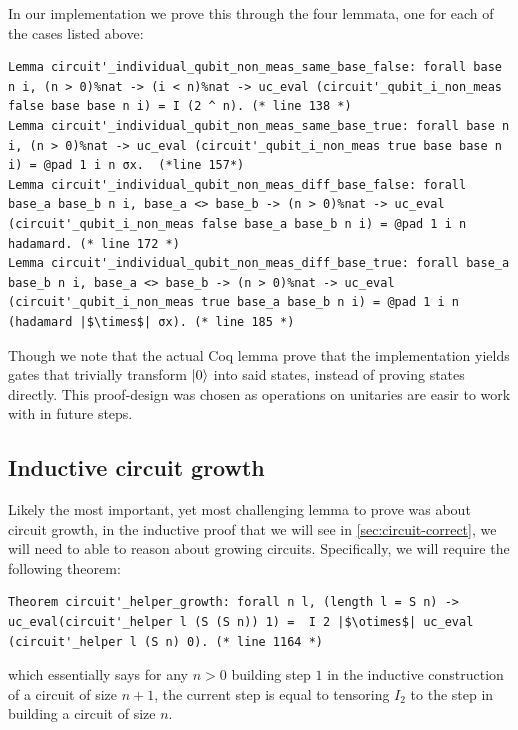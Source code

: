 \documentclass{article}
\begin{document}
In our implementation we prove this through the four lemmata, one for each of the cases listed above:
\begin{verbatim}
Lemma circuit'_individual_qubit_non_meas_same_base_false: forall base n i, (n > 0)%nat -> (i < n)%nat -> uc_eval (circuit'_qubit_i_non_meas false base base n i) = I (2 ^ n). (* line 138 *)
Lemma circuit'_individual_qubit_non_meas_same_base_true: forall base n i, (n > 0)%nat -> uc_eval (circuit'_qubit_i_non_meas true base base n i) = @pad 1 i n σx.  (*line 157*)
Lemma circuit'_individual_qubit_non_meas_diff_base_false: forall base_a base_b n i, base_a <> base_b -> (n > 0)%nat -> uc_eval (circuit'_qubit_i_non_meas false base_a base_b n i) = @pad 1 i n hadamard. (* line 172 *)
Lemma circuit'_individual_qubit_non_meas_diff_base_true: forall base_a base_b n i, base_a <> base_b -> (n > 0)%nat -> uc_eval (circuit'_qubit_i_non_meas true base_a base_b n i) = @pad 1 i n (hadamard |$\times$| σx). (* line 185 *)

\end{verbatim}
Though we note that the actual Coq lemma prove that the implementation yields gates that trivially transform $\ket{0}$ into said states, instead of proving states directly. 
This proof-design was chosen as operations on unitaries are easir to work with in future steps.

\subsection{Inductive circuit growth}\label{sec:circuit-growth}

Likely the most important, yet most challenging lemma to prove was about circuit growth, in the inductive proof that we will see in \cref{sec:circuit-correct}, we will need to able to reason about growing circuits.
Specifically, we will require the following theorem:
\begin{verbatim}
Theorem circuit'_helper_growth: forall n l, (length l = S n) ->  uc_eval(circuit'_helper l (S (S n)) 1) =  I 2 |$\otimes$| uc_eval (circuit'_helper l (S n) 0). (* line 1164 *)
\end{verbatim}
which essentially says for any $n>0$ building step $1$ in the inductive construction of a circuit of size $n+1$, the current step is equal to tensoring $I_2$ to the  step in building a circuit of size $n$.
\end{document}
